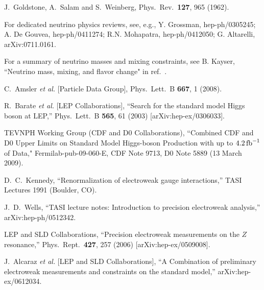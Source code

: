 \documentclass[12pt]{article}
\def\xfb{\, {\rm fb}}
\begin{document}
\begin{thebibliography}{9}


  J.~Goldstone, A.~Salam and S.~Weinberg,
  Phys.\ Rev.\  {\bf 127}, 965 (1962).

  For dedicated neutrino physics reviews, see, e.g., Y. Grossman, hep-ph/0305245; A. De Gouvea, hep-ph/0411274; R.N. Mohapatra, hep-ph/0412050; G. Altarelli, arXiv:0711.0161.

For a summary of neutrino masses and mixing constraints, see B. Kayser, ``Neutrino mass, mixing, and flavor change" in ref.~\cite{Amsler:2008zzb}.  
  
  C.~Amsler {\it et al.}  [Particle Data Group],
  Phys.\ Lett.\  B {\bf 667}, 1 (2008).

  
  R.~Barate {\it et al.}  [LEP Collaborations],
  ``Search for the standard model Higgs boson at LEP,''
  Phys.\ Lett.\  B {\bf 565}, 61 (2003)
  [arXiv:hep-ex/0306033].

 TEVNPH Working Group (CDF and D0 Collaborations), ``Combined CDF and D0 Upper Limits on Standard Model Higgs-boson Production with up to $4.2\xfb^{-1}$ of Data," Fermilab-pub-09-060-E, CDF Note 9713, D0 Note 5889 (13 March 2009).
 
  D.~C.~Kennedy,
  ``Renormalization of electroweak gauge interactions,''
TASI Lectures 1991 (Boulder, CO).

  J.~D.~Wells,
  ``TASI lecture notes: Introduction to precision electroweak analysis,''
  arXiv:hep-ph/0512342.
  
    LEP and SLD Collaborations,
  ``Precision electroweak measurements on the $Z$ resonance,''
  Phys.\ Rept.\  {\bf 427}, 257 (2006)
  [arXiv:hep-ex/0509008].

  J.~Alcaraz {\it et al.}  [LEP and SLD Collaborations],
  ``A Combination of preliminary electroweak measurements and constraints on
  the standard model,''
  arXiv:hep-ex/0612034.
  

\end{thebibliography}
\end{document}
